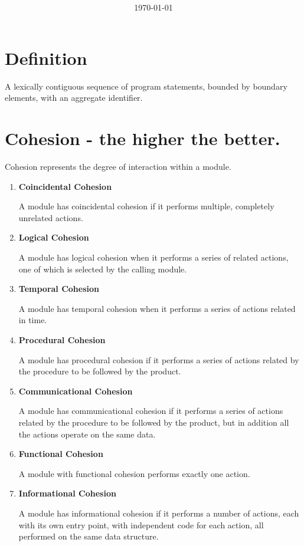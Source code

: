 \documentclass[11pt]{article}
\title{\textbf{\Topic}}
\author{\Name}
\date{\today}
\begin{document}
\maketitle
\noindent\makebox[\linewidth]{\rule[8pt]{5in}{0.5pt}}

\section*{Definition}

A lexically contiguous sequence of program statements, bounded by boundary elements, with an aggregate identifier.

\section*{Cohesion - the higher the better.}

Cohesion represents the degree of interaction within a module. 

\begin{enumerate}
	\item \textbf{Coincidental Cohesion}
	
	A module has coincidental cohesion if it performs multiple, completely unrelated actions.
	
	\item \textbf{Logical Cohesion}
	
	A module has logical cohesion when it performs a series of related actions, one of which is selected by the calling module.
	
	\item \textbf{Temporal Cohesion}
	
	A module has temporal cohesion when it performs a series of actions related in time.
	
	\item \textbf{Procedural Cohesion}
	
	A module has procedural cohesion if it performs a series of actions related by the procedure to be followed by the product.

	\item \textbf{Communicational Cohesion}
	
	A module has communicational cohesion if it performs a series of actions related by the procedure to be followed by the product, but in addition all the actions operate on the same data.
	
	\item \textbf{Functional Cohesion}
	
	A module with functional cohesion performs exactly one action.
	
	\item \textbf{Informational Cohesion}
	
	A module has informational cohesion if it performs a number of actions, each with its own entry point, with independent code for each action, all performed on the same data structure.
	
\end{enumerate}
\end{document}
